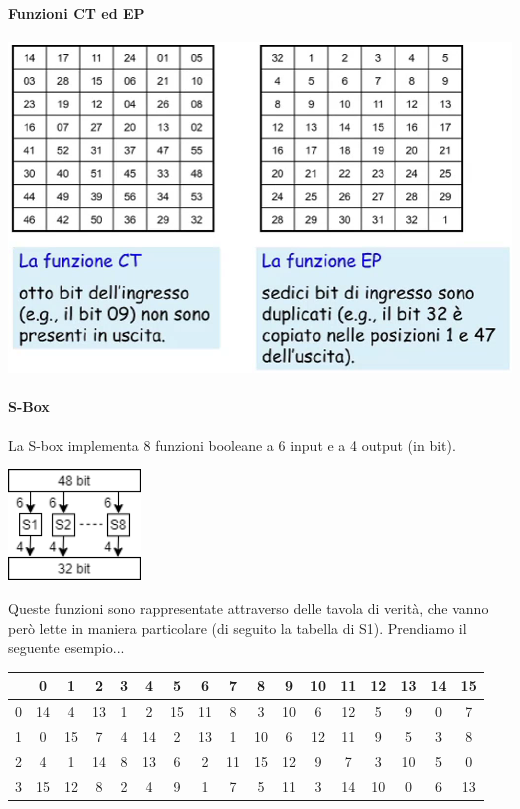 \paragraph{Funzioni CT ed EP}
\begin{center}
	\includegraphics[scale=.5]{images/18.PNG}
\end{center}

\paragraph{S-Box} La S-box implementa 8 funzioni booleane a 6 input e a 4 output (in bit).
\begin{center}
    \includegraphics[width = 100pt]{images/DES_3.png}
\end{center}
Queste funzioni sono rappresentate attraverso delle tavola di verità, che vanno però lette in maniera particolare (di seguito la tabella di S1). Prendiamo il seguente esempio...
\begin{table}[ht!]
    \centering
    \small
    \begin{tabular}{c|c c c c c c c c c c c c c c c c}
        & 0 & 1 & 2 & 3 & 4 & 5 & 6 & 7 & 8 & 9 & 10 & 11 & 12 & 13 & 14 & 15 \\
        \hline
        0 & 14 & 4 & 13 & 1 & 2 & 15 & 11 & 8 & 3 & 10 & 6 & 12 & 5 & 9 & 0 & 7 \\
        1 & 0 & 15 & 7 & 4 & 14 & 2 & 13 & 1 & 10 & 6 & 12 & 11 & 9 & 5 & 3 & 8 \\
        2 & 4 & 1 & 14 & 8 & 13 & 6 & 2 & 11 & 15 & 12 & 9 & 7 & 3 & 10 & 5 & 0 \\
        3 & 15 & 12 & 8 & 2 & 4 & 9 & 1 & 7 & 5 & 11 & 3 & 14 & 10 & 0 & 6 & 13 \\
    \end{tabular}
\end{table}

